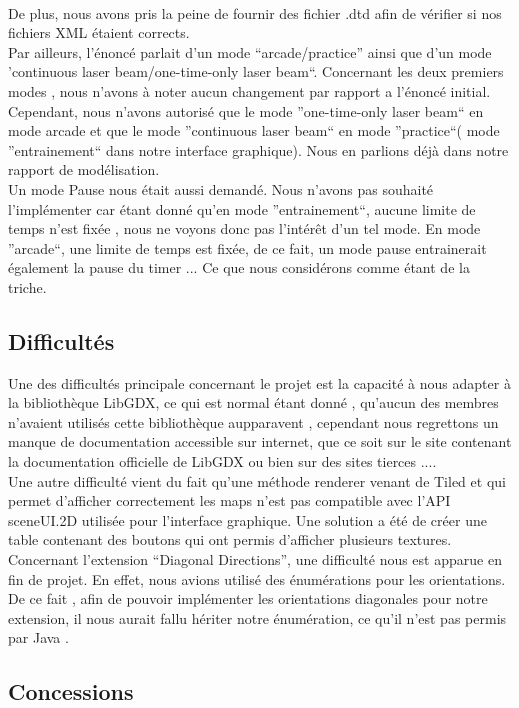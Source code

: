 \documentclass[a4paper,10pt]{article}
\begin{document}
\\
De plus, nous avons pris la peine de fournir des fichier .dtd afin de vérifier si nos fichiers XML étaient corrects.
\\
Par ailleurs, l'énoncé parlait d'un mode ``arcade/practice'' ainsi que d'un mode 'continuous laser beam/one-time-only laser beam``. Concernant les
deux premiers modes , nous n'avons à noter aucun changement par rapport a l'énoncé initial. Cependant, nous n'avons autorisé que le mode ''one-time-only laser beam``
en mode arcade et que le mode ''continuous laser beam`` en mode ''practice``( mode ''entrainement`` dans notre interface graphique).
Nous en parlions déjà dans notre rapport de modélisation.
\\
Un mode Pause nous était aussi demandé. Nous n'avons pas souhaité l'implémenter car étant donné qu'en mode ''entrainement``, aucune limite de
temps n'est fixée , nous ne voyons donc pas l'intérêt d'un tel mode. En mode ''arcade``, une limite de temps est fixée, de ce fait, un mode pause entrainerait
également la pause du timer ... Ce que nous considérons comme étant de la triche.

\subsection{Difficultés}
Une des difficultés principale concernant le projet est la capacité à nous adapter à la bibliothèque LibGDX, ce qui est normal étant donné , qu'aucun des membres
n'avaient utilisés cette bibliothèque aupparavent , cependant nous regrettons un manque de documentation accessible sur internet, que ce soit sur 
le site contenant la documentation officielle de LibGDX  ou bien sur des sites tierces ....
\\
Une autre difficulté vient du fait qu'une méthode renderer venant de Tiled et qui permet d'afficher correctement les maps n'est pas compatible avec
l'API sceneUI.2D utilisée pour l'interface graphique. Une solution a été de créer une table contenant des boutons qui ont permis d'afficher plusieurs
textures.
\\
Concernant l'extension ``Diagonal Directions'', une difficulté nous est apparue en fin de projet. En effet, nous avions utilisé des énumérations pour
les orientations. De ce fait , afin de pouvoir implémenter les orientations diagonales pour notre extension, il nous aurait fallu hériter notre énumération,
 ce qu'il n'est pas permis par Java .
\subsection{Concessions}
\end{document}
